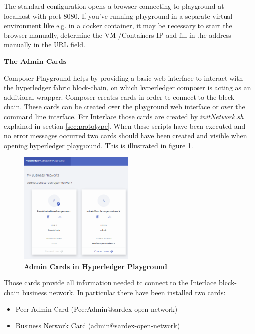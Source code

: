 The standard configuration opens a browser connecting to playground at localhost with port 8080. If you've running playground in a separate virtual environment like e.g. in a docker container, it may be necessary to start the browser manually, determine the VM-/Containers-IP and fill in the address manually in the URL field.

\textbf{The Admin Cards}

Composer Playground helps by providing a basic web interface to interact with the hyperledger fabric block-chain, on which hyperledger composer is acting as an additional wrapper. Composer creates cards in order to connect to the block-chain. These cards can be created over the playground web interface or over the command line interface. For Interlace those cards are created by \textit{initNetwork.sh} explained in section \ref{sec:prototype}. When those scripts have been executed and no error messages occurred two cards should have been created and visible when opening hyperledger playground. This is illustrated in figure \ref{fig:admin-cards}.

\begin{figure}[htbp]
  \centering
  \includegraphics[width=0.5\textwidth]{Figures/admin-cards}
  \caption{\bf\small Admin Cards in Hyperledger Playground}
  \label{fig:admin-cards}
\end{figure}

Those cards provide all information needed to connect to the Interlace block-chain business network. In particular there have been installed two cards:

\begin{itemize}
	\item Peer Admin Card (PeerAdmin@sardex-open-network)
	\item Business Network Card (admin@sardex-open-network)
\end{itemize}


